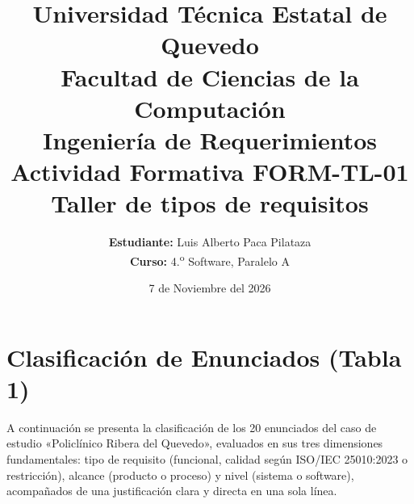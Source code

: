 \documentclass[11pt,a4paper]{article}
\title{\textbf{Universidad Técnica Estatal de Quevedo}\\[0.3em]
\large Facultad de Ciencias de la Computación\\[0.5em]
\Large Ingeniería de Requerimientos\\[0.8em]
\LARGE \textbf{Actividad Formativa FORM-TL-01}\\
\Large Taller de tipos de requisitos}
\author{\textbf{Estudiante:} Luis Alberto Paca Pilataza \\
\textbf{Curso:} 4.\textsuperscript{o} Software, Paralelo A}
\date{7 de Noviembre del 2026}
\begin{document}
\maketitle

\section{Clasificación de Enunciados (Tabla 1)}

A continuación se presenta la clasificación de los 20 enunciados del caso de estudio «Policlínico Ribera del Quevedo», evaluados en sus tres dimensiones fundamentales: tipo de requisito (funcional, calidad según ISO/IEC 25010:2023 o restricción), alcance (producto o proceso) y nivel (sistema o software), acompañados de una justificación clara y directa en una sola línea.
\end{document}
